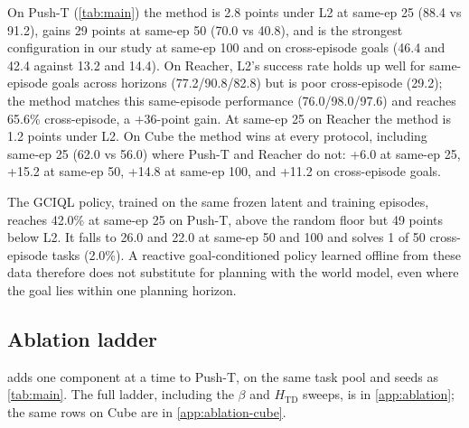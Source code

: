 \documentclass{article} %
\begin{document}
On Push-T (\cref{tab:main}) the method is 2.8 points under L2 at same-ep 25 (88.4 vs 91.2),
gains 29 points at same-ep 50 (70.0 vs 40.8), and is the strongest configuration in our study at
same-ep 100 and on cross-episode goals (46.4 and 42.4 against 13.2 and 14.4). On Reacher, L2's
success rate holds up well for same-episode goals across horizons (77.2/90.8/82.8) but is poor
cross-episode (29.2); the method matches this same-episode performance (76.0/98.0/97.6) and
reaches 65.6\% cross-episode, a $+36$-point gain. At same-ep 25 on Reacher the method is 1.2
points under L2. On Cube the method wins at every protocol, including same-ep 25 (62.0 vs
56.0) where Push-T and Reacher do not: +6.0 at same-ep 25, +15.2 at same-ep 50, +14.8 at
same-ep 100, and +11.2 on cross-episode goals.

The GCIQL policy, trained on the same frozen latent and training episodes, reaches 42.0\% at
same-ep 25 on Push-T, above the random floor but 49 points below L2. It falls to 26.0 and 22.0
at same-ep 50 and 100 and solves 1 of 50 cross-episode tasks (2.0\%). A reactive goal-conditioned
policy learned offline from these data therefore does not substitute for planning with the world
model, even where the goal lies within one planning horizon.

\subsection{Ablation ladder}
\label{sec:ablation}
 adds one component at a time to Push-T, on the same task pool and seeds as
\cref{tab:main}. The full ladder, including the $\beta$ and $H_{\mathrm{TD}}$ sweeps, is in
\cref{app:ablation}; the same rows on Cube are in \cref{app:ablation-cube}.
\end{document}
